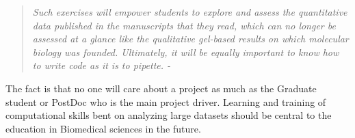     \begin{quote} %
      \itshape 
      Such exercises will empower students to explore and assess the quantitative data published in the manuscripts that they read, which can no longer be assessed at a glance like the qualitative gel-based results on which molecular biology was founded. Ultimately, it will be equally important to know how to write code as it is to pipette. - \citep{Plocik2013}
      \singlespacing
      \end{quote}

    The fact is that no one will care about a project as much as the Graduate student or PostDoc who is the main project driver. Learning and training of computational skills bent on analyzing large datasets should be central to the education in Biomedical sciences in the future.

\cleardoublepage